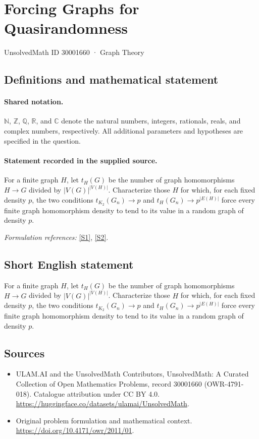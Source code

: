 \documentclass[11pt]{article}
\newcommand{\sref}[2]{\hyperlink{source:#1:#2}{[S#2]}}
\begin{document}
\setcounter{section}{30001659}
\section{Forcing Graphs for Quasirandomness}\label{30001660}
{\small UnsolvedMath ID 30001660 · Graph Theory}
\subsection{Definitions and mathematical statement}

\paragraph{Shared notation.}$\mathbb N$, $\mathbb Z$, $\mathbb Q$, $\mathbb R$, and $\mathbb C$ denote the natural numbers, integers, rationals, reals, and complex numbers, respectively. All additional parameters and hypotheses are specified in the question.


\paragraph{Statement recorded in the supplied source.}
For a finite graph $H$, let $t_H(G)$ be the number of graph homomorphisms $H\to G$ divided by $|V(G)|^{|V(H)|}$. Characterize those $H$ for which, for each fixed density $p$, the two conditions $t_{K_2}(G_n)\to p$ and $t_H(G_n)\to p^{|E(H)|}$ force every finite graph homomorphism density to tend to its value in a random graph of density $p$.
\par\smallskip\textit{Formulation references:} \sref{30001660}{1}, \sref{30001660}{2}.
\subsection{Short English statement}
For a finite graph $H$, let $t_H(G)$ be the number of graph homomorphisms $H\to G$ divided by $|V(G)|^{|V(H)|}$. Characterize those $H$ for which, for each fixed density $p$, the two conditions $t_{K_2}(G_n)\to p$ and $t_H(G_n)\to p^{|E(H)|}$ force every finite graph homomorphism density to tend to its value in a random graph of density $p$.
\subsection{Sources}
\begin{itemize}
\item[\hypertarget{source:30001660:1}{S1}] ULAM.AI and the UnsolvedMath Contributors, UnsolvedMath: A Curated Collection of Open Mathematics Problems, record 30001660 (OWR-4791-018). Catalogue attribution under CC BY 4.0.
\url{https://huggingface.co/datasets/ulamai/UnsolvedMath}.
\item[\hypertarget{source:30001660:2}{S2}] Original problem formulation and mathematical context.
\url{https://doi.org/10.4171/owr/2011/01}.
\end{itemize}
\label{end:30001660}
\end{document}
